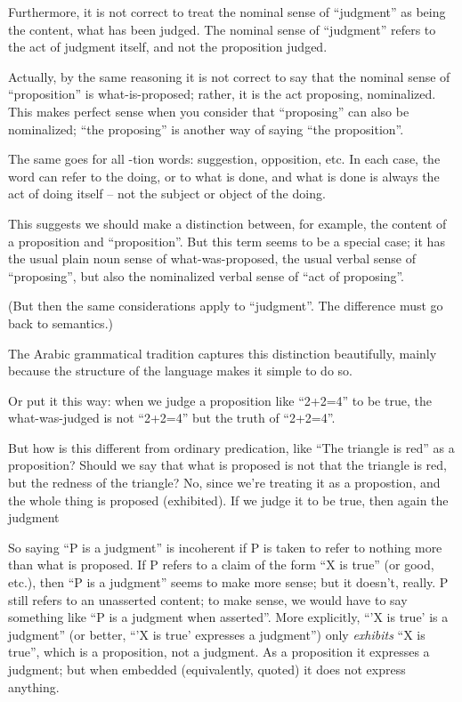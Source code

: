 \documentclass[12pt,toc]{tufte-handout}
\theoremstyle{plain}
\begin{document}
Furthermore, it is not correct to treat the nominal sense of
``judgment'' as being the content, what has been judged.  The nominal
sense of ``judgment'' refers to the act of judgment itself, and not
the proposition judged.

Actually, by the same reasoning it is not correct to say that the
nominal sense of ``proposition'' is what-is-proposed; rather, it is
the act proposing, nominalized.  This makes perfect sense when you
consider that ``proposing'' can also be nominalized; ``the proposing''
is another way of saying ``the proposition''.

The same goes for all -tion words: suggestion, opposition, etc.  In
each case, the word can refer to the doing, or to what is done, and
what is done is always the act of doing itself -- not the subject or
object of the doing.

This suggests we should make a distinction between, for example, the
content of a proposition and ``proposition''.  But this term seems to
be a special case; it has the usual plain noun sense of
what-was-proposed, the usual verbal sense of ``proposing'', but also
the nominalized verbal sense of ``act of proposing''.

(But then the same considerations apply to ``judgment''.  The
difference must go back to semantics.)

\begin{remark}
  The Arabic grammatical tradition captures this distinction
  beautifully, mainly because the structure of the language makes it
  simple to do so.
\end{remark}

Or put it this way: when we judge a proposition like ``2+2=4'' to be
true, the what-was-judged is not ``2+2=4'' but the truth of ``2+2=4''.

\begin{remark}
  But how is this different from ordinary predication, like ``The
  triangle is red'' as a proposition?  Should we say that what is
  proposed is not that the triangle is red, but the redness of the
  triangle?  No, since we're treating it as a propostion, and the
  whole thing is proposed (exhibited).  If we judge it to be true,
  then again the judgment 
\end{remark}

So saying ``P is a judgment'' is incoherent if P is taken to refer to
nothing more than what is proposed.  If P refers to a claim of the
form ``X is true'' (or good, etc.), then ``P is a judgment'' seems to
make more sense; but it doesn't, really.  P still refers to an
unasserted content; to make sense, we would have to say something like
``P is a judgment when asserted''.  More explicitly, ``'X is true' is
a judgment'' (or better, ``'X is true' expresses a judgment'') only
\textit{exhibits} ``X is true'', which is a proposition, not a
judgment.  As a proposition it expresses a judgment; but when embedded
(equivalently, quoted) it does not express anything.
\end{document}
